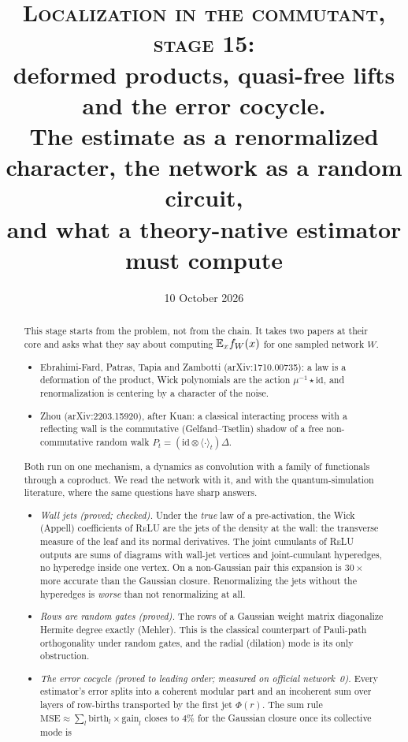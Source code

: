 \documentclass[11pt]{article}
\title{\textsc{Localization in the commutant, stage 15:}\\ \large deformed products, quasi-free lifts and the error cocycle.\\
The estimate as a renormalized character, the network as a random circuit,\\ and what a theory-native estimator must compute}
\author{}
\date{10 October 2026}
\theoremstyle{plain}
\theoremstyle{definition}\newtheorem{definition}[theorem]{Definition}\newtheorem{remark}[theorem]{Remark}
\begin{document}
\maketitle
\begin{abstract}
This stage starts from the problem, not from the chain. It takes two papers at their core and asks what they say about computing
$\mathbb E_x f_W(x)$ for one sampled network $W$.
\begin{itemize}[leftmargin=*]
\item Ebrahimi-Fard, Patras, Tapia and Zambotti (arXiv:1710.00735): a law is a deformation of the product, Wick polynomials are the
action $\mu^{-1}\star\mathrm{id}$, and renormalization is centering by a character of the noise.
\item Zhou (arXiv:2203.15920), after Kuan: a classical interacting process with a reflecting wall is the commutative
(Gelfand--Tsetlin) shadow of a free non-commutative random walk $P_t=(\mathrm{id}\otimes\langle\cdot\rangle_t)\Delta$.
\end{itemize}
Both run on one mechanism, a dynamics as convolution with a family of functionals through a coproduct. We read the network with it,
and with the quantum-simulation literature, where the same questions have sharp answers.
\begin{itemize}[leftmargin=*]
\item \emph{Wall jets (proved; checked).} Under the \emph{true} law of a pre-activation, the Wick (Appell) coefficients of \textsc{ReLU}
are the jets of the density at the wall: the transverse measure of the leaf and its normal derivatives. The joint cumulants of
\textsc{ReLU} outputs are sums of diagrams with wall-jet vertices and joint-cumulant hyperedges, no hyperedge inside one vertex. On a
non-Gaussian pair this expansion is $30\times$ more accurate than the Gaussian closure. Renormalizing the jets without the hyperedges
is \emph{worse} than not renormalizing at all.
\item \emph{Rows are random gates (proved).} The rows of a Gaussian weight matrix diagonalize Hermite degree exactly (Mehler). This is
the classical counterpart of Pauli-path orthogonality under random gates, and the radial (dilation) mode is its only obstruction.
\item \emph{The error cocycle (proved to leading order; measured on official network~0).} Every estimator's error splits into a
coherent modular part and an incoherent sum over layers of row-births transported by the first jet $\Phi(r)$. The sum rule
$\mathrm{MSE}\approx\sum_l\mathrm{birth}_l\times\mathrm{gain}_l$ closes to $4\%$ for the Gaussian closure once its collective mode is

\end{itemize}
\end{abstract}
\end{document}

